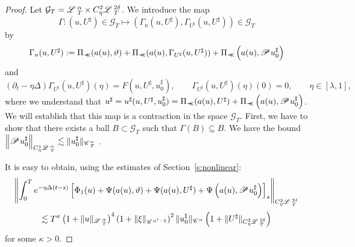 \documentclass[11pt,reqno]{amsart}
\newcommand{\assign}{:=}
\newcommand{\precprec}{\prec\!\!\!\prec}
\newcommand{\CC}{\mathscr{C} \hspace{.1em}}
\newcommand{\LL}{\mathscr{L} \hspace{.2em}}
\newcommand{\PP}{\mathscr{P} \hspace{.1em}}
\begin{document}
\begin{proof}
  Let $\mathcal{G}_T = \LL^{\alpha}_T \times C_{\eta}^2 \LL^{2 \delta}_T$. We
  introduce the map $$\Gamma : (u, U^{\sharp}) \in \mathcal{G}_T \mapsto
  (\Gamma_u (u, U^{\sharp}), \Gamma_{U^{\sharp}} (u, U^{\sharp})) \in
  \mathcal{G}_T$$ by
  \[ \Gamma_u (u, U^{\sharp}) \assign \Pi_{\precprec} (a (u), \vartheta) +
     \Pi_{\precprec} (a (u), \Gamma_{U^{\sharp}} (u, U^{\sharp})) +
     \Pi_{\precprec} \left( a (u), \PP u_0^{\sharp} \right) \]
  and
  \[ (\partial_t - \eta \Delta) \Gamma_{U^{\sharp}} (u, U^{\sharp}) (\eta) = F
     (u, U^{\sharp}, u_0^{\sharp}), \qquad \Gamma_{U^{\sharp}} (u, U^{\sharp})
     (\eta) (0) = 0, \qquad \eta \in [\lambda, 1], \]
  where we understand that $u^{\sharp} = u^{\sharp} (u, U^{\sharp},
  u_0^{\sharp}) = \Pi_{\precprec} (a (u), U^{\sharp}) + \Pi_{\precprec} \left(
  a (u), \PP u_0^{\sharp} \right)$. We will establish that this map is a
  contraction in the space $\mathcal{G}_T .$ First, we have to show that there
  exists a ball $B \subset \mathcal{G}_T$ such that $\Gamma (B) \subseteq B$.
  We have the bound $\left\| \PP u_0^{\sharp} \right\|_{C^1_{\eta}
  \LL^{\alpha}_T} \lesssim \| u^{\sharp}_0 \|_{\CC^{\alpha}_T}$ .
  
  It is easy to obtain, using the estimates of Section~\ref{s:nonlinear}:
  \[ \left\| \int_0^T e^{- \eta \Delta (t - s)} \left[ \Phi_1 (u) + \Psi (a
     (u), \vartheta) + \Psi (a (u), U^{\sharp}) + \Psi \left( a (u), \PP
     u_0^{\sharp} \right) \right]_s \right\|_{C^2_{\eta} \LL_T^{2 \delta}} \]
  \[ \lesssim T^{\kappa} \left( 1 + \| u \|_{\LL^{\alpha}_T} \right)^4 \left(
     1 + \| \xi \|_{\CC^{\alpha' - 2}} \right)^2 \| u_0^{\sharp}
     \|_{\CC^{\alpha}} \left( 1 + \| U^{\sharp} \|_{C^2_{\eta} \LL^{2
     \delta}_T} \right) \]
  for some $\kappa > 0$.
  

\end{proof}
\end{document}
